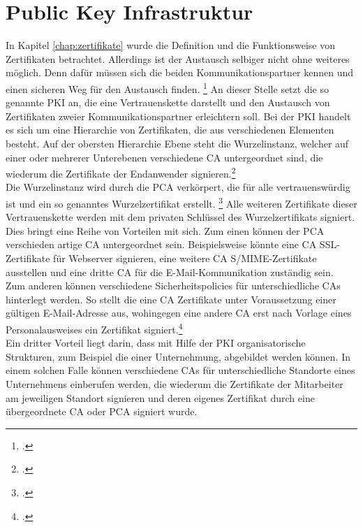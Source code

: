 \documentclass  [paper=a4,
				fontsize=12pt,
				listof=totoc,
				bibliography=totoc
				]{scrreprt}
\begin{document}
		\section{Public Key Infrastruktur}
			In Kapitel \ref*{chap:zertifikate} wurde die Definition und die Funktionsweise von Zertifikaten betrachtet. Allerdings ist der Austausch selbiger nicht ohne weiteres möglich. Denn dafür müssen sich die beiden Kommunikationspartner \glqq kennen und einen sicheren Weg für den Austausch finden\grqq{}. \footcite[][]{BSI}
			An dieser Stelle setzt die so genannte \ac{PKI} an, die eine Vertrauenskette darstellt und den Austausch von Zertifikaten zweier Kommunikationspartner erleichtern soll.
			\newpage
			Bei der \ac{PKI} handelt es sich um eine Hierarchie von Zertifikaten, die aus verschiedenen Elementen besteht. Auf der obersten Hierarchie Ebene steht die Wurzelinstanz, welcher auf einer oder mehrerer Unterebenen verschiedene \ac{CA} untergeordnet sind, die wiederum die Zertifikate der Endanwender signieren.\footcite[Vgl.][S. 23]{Schwenk}\\
			Die Wurzelinstanz wird durch die \ac{PCA} verkörpert, die  für alle vertrauenswürdig ist und ein so genanntes Wurzelzertifikat erstellt. \footcite[Vgl. ][]{ITWissen2012} 
			Alle weiteren Zertifikate dieser Vertrauenskette werden mit dem privaten Schlüssel des Wurzelzertifikats signiert.\medskip\\ %
			Dies bringt eine Reihe von Vorteilen mit sich. Zum einen können der \ac{PCA} verschieden artige \ac{CA} untergeordnet sein. Beispielsweise könnte eine \ac{CA} SSL-Zertifikate für Webserver signieren, eine weitere \ac{CA} \ac{S/MIME}-Zertifikate ausstellen und eine dritte \ac{CA} für die E-Mail-Kommunikation zuständig sein.\\
			Zum anderen können verschiedene Sicherheitspolicies für unterschiedliche \acp{CA} hinterlegt werden. So stellt die eine \ac{CA} Zertifikate unter Voraussetzung einer gültigen E-Mail-Adresse aus, wohingegen eine andere \ac{CA} erst nach Vorlage eines Personalausweises ein Zertifikat signiert.\footcite[Vgl.][S. 24]{Schwenk}\\
			Ein dritter Vorteil liegt darin, dass mit Hilfe der \ac{PKI} organisatorische Strukturen, zum Beispiel die einer Unternehmung, abgebildet werden können. In einem solchen Falle können verschiedene \ac{CA}s für unterschiedliche Standorte eines Unternehmens einberufen werden, die wiederum die Zertifikate der Mitarbeiter am jeweiligen Standort signieren und deren eigenes Zertifikat durch eine übergeordnete \ac{CA} oder \ac{PCA} signiert wurde.\medskip\\
\end{document}
